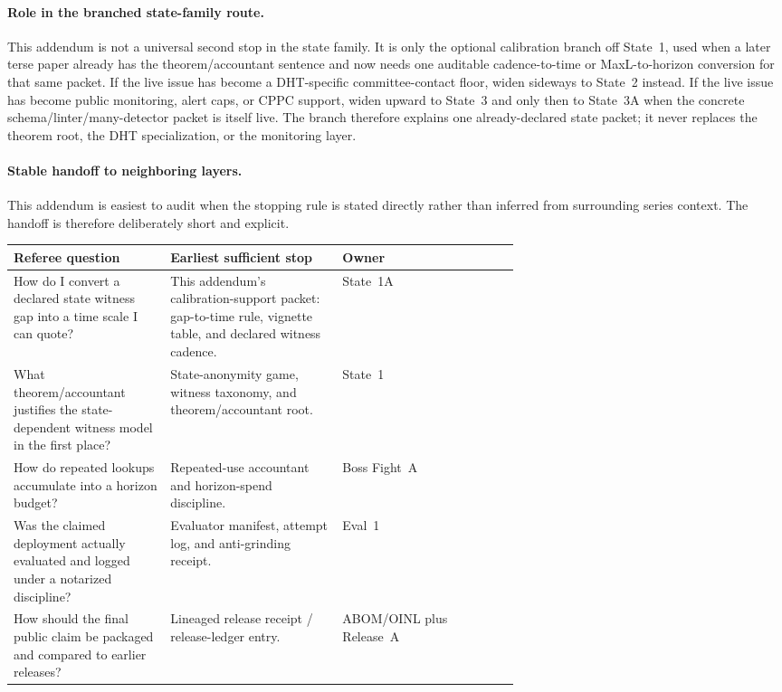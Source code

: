 \documentclass[11pt]{article}
\theoremstyle{definition}
\theoremstyle{remark}
\begin{document}
\paragraph{Role in the branched state-family route.}
This addendum is not a universal second stop in the state family.  It is only the optional calibration branch off State~1, used when a later terse paper already has the theorem/accountant sentence and now needs one auditable cadence-to-time or MaxL-to-horizon conversion for that same packet.  If the live issue has become a DHT-specific committee-contact floor, widen sideways to State~2 instead.  If the live issue has become public monitoring, alert caps, or CPPC support, widen upward to State~3 and only then to State~3A when the concrete schema/linter/many-detector packet is itself live.  The branch therefore explains one already-declared state packet; it never replaces the theorem root, the DHT specialization, or the monitoring layer.\cite{series:state1,series:state2,series:state3,series:state3addendum}

\paragraph{Stable handoff to neighboring layers.}
This addendum is easiest to audit when the stopping rule is stated directly rather than inferred from surrounding series context.
The handoff is therefore deliberately short and explicit.

\begin{center}
\begin{tabularx}{0.97\linewidth}{@{}>{\raggedright\arraybackslash}p{0.31\linewidth}>{\raggedright\arraybackslash}p{0.34\linewidth}>{\raggedright\arraybackslash}X@{}}
\toprule
\textbf{Referee question} & \textbf{Earliest sufficient stop} & \textbf{Owner} \\
\midrule
How do I convert a declared state witness gap into a time scale I can quote? & This addendum's calibration-support packet: gap-to-time rule, vignette table, and declared witness cadence. & State~1A \\
What theorem/accountant justifies the state-dependent witness model in the first place? & State-anonymity game, witness taxonomy, and theorem/accountant root. & State~1 \\
How do repeated lookups accumulate into a horizon budget? & Repeated-use accountant and horizon-spend discipline. & Boss Fight~A \\
Was the claimed deployment actually evaluated and logged under a notarized discipline? & Evaluator manifest, attempt log, and anti-grinding receipt. & Eval~1 \\
How should the final public claim be packaged and compared to earlier releases? & Lineaged release receipt / release-ledger entry. & ABOM/OINL plus Release~A \\
\bottomrule
\end{tabularx}
\end{center}
\end{document}
